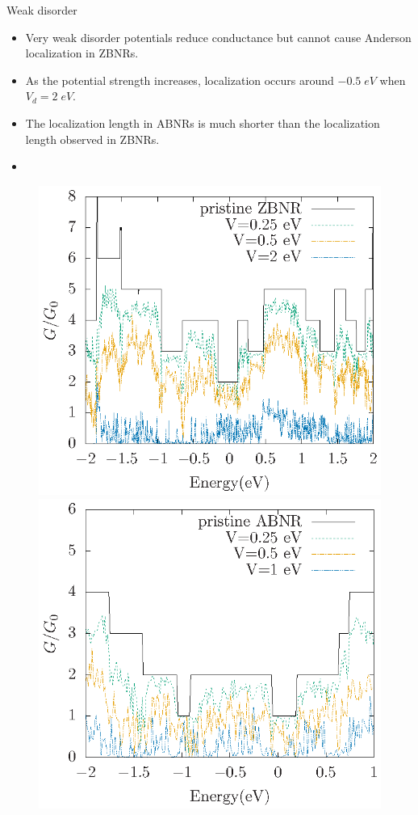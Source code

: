 \documentclass[handout,t]{beamer}
\begin{document}
\begin{frame}{Weak disorder}
	\begin{itemize}
	\item Very weak disorder potentials reduce conductance but cannot cause Anderson localization in ZBNRs.
	\item As the potential strength increases, localization occurs around $-0.5\; eV$ when $V_d = 2\; eV$.
	\item The localization length in ABNRs is much shorter than the localization length observed in ZBNRs.
	\item 
	\end{itemize}
	\begin{figure}[ht]
		\centering
		\includegraphics[width=0.45\linewidth]{../figures/zigzagdisorder-thesis.eps}
		\includegraphics[width=0.45\linewidth]{../figures/armdisorder-thesis.eps}
	\end{figure}
\end{frame}
\end{document}
